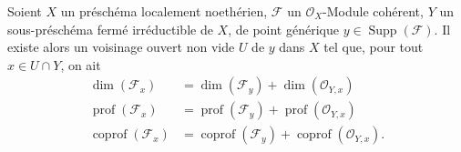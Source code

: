 \begin{proposition}[6.10.6]
\label{IV.2.s6.10.6-fr}
Soient $X$ un préschéma localement noethérien, $\mathcal F$ un
$\mathcal O_X$-Module cohérent, $Y$ un sous-préschéma fermé irréductible de
$X$, de point générique $y\in\operatorname{Supp}(\mathcal F)$. Il existe
alors un voisinage ouvert non vide $U$ de $y$ dans $X$ tel que, pour tout
$x\in U\cap Y$, on ait
\begin{align}
\dim(\mathcal F_x)&=\dim(\mathcal F_y)+\dim(\mathcal O_{Y,x})
\tag{6.10.6.1}\label{IV.2.s6.10.6.1-fr}\\
\operatorname{prof}(\mathcal F_x)&=\operatorname{prof}(\mathcal F_y)+
\operatorname{prof}(\mathcal O_{Y,x})
\tag{6.10.6.2}\label{IV.2.s6.10.6.2-fr}\\
\operatorname{coprof}(\mathcal F_x)&=\operatorname{coprof}(\mathcal F_y)+
\operatorname{coprof}(\mathcal O_{Y,x}).
\tag{6.10.6.3}\label{IV.2.s6.10.6.3-fr}
\end{align}
\end{proposition}

